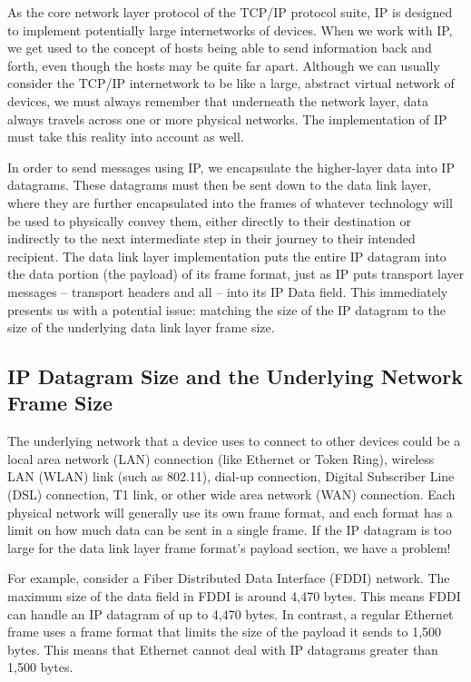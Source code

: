 \documentclass[b5paper,11pt]{memoir}
\begin{document}
\protect\hypertarget{ch22.htmlux5cux23idx-CHP-22-0793}{}{}As the core
network layer protocol of the TCP/IP protocol suite, IP is designed to
implement potentially large internetworks of devices. When we work with
IP, we get used to the concept of hosts being able to send information
back and forth, even though the hosts may be quite far apart. Although
we can usually consider the TCP/IP internetwork to be like a large,
abstract virtual network of devices, we must always remember that
underneath the network layer, data always travels across one or more
physical networks. The implementation of IP must take this reality into
account as well.

In order to send messages using IP, we encapsulate the higher-layer data
into IP datagrams. These datagrams must then be sent down to the data
link layer, where they are further encapsulated into the frames of
whatever technology will be used to physically convey them, either
directly to their destination or indirectly to the next intermediate
step in their journey to their intended recipient. The data link layer
implementation puts the entire IP datagram into the data portion (the
payload) of its frame format, just as IP puts transport layer
messages -- transport headers and all -- into its IP Data field. This
immediately presents us with a potential issue: matching the size of the
IP datagram to the size of the underlying data link layer frame size.

\subsection[IP Datagram Size and the Underlying Network Frame
Size]{\texorpdfstring{\protect\hypertarget{ch22.htmlux5cux23ip_datagram_size_and_the_underlying_netw}{}{}IP
Datagram Size and the Underlying Network Frame
Size}{IP Datagram Size and the Underlying Network Frame Size}}

The underlying network that a device uses to connect to other devices
could be a local area network (LAN) connection (like Ethernet or Token
Ring), wireless LAN (WLAN) link (such as 802.11), dial-up connection,
Digital Subscriber Line (DSL) connection, T1 link, or other wide area
network (WAN) connection. Each physical network will generally use its
own frame format, and each format has a limit on how much data can be
sent in a single frame. If the IP datagram is too large for the data
link layer frame format's payload section, we have a problem!

For example, consider a
\protect\hypertarget{ch22.htmlux5cux23idx-CHP-22-0794}{}{}Fiber
Distributed Data Interface
(\protect\hypertarget{ch22.htmlux5cux23idx-CHP-22-0795}{}{}FDDI)
network. The maximum size of the data field in FDDI is around 4,470
bytes. This means FDDI can handle an IP datagram of up to 4,470 bytes.
In contrast, a regular Ethernet frame uses a frame format that limits
the size of the payload it sends to 1,500 bytes. This means that
Ethernet cannot deal with IP datagrams greater than 1,500 bytes.
\end{document}
